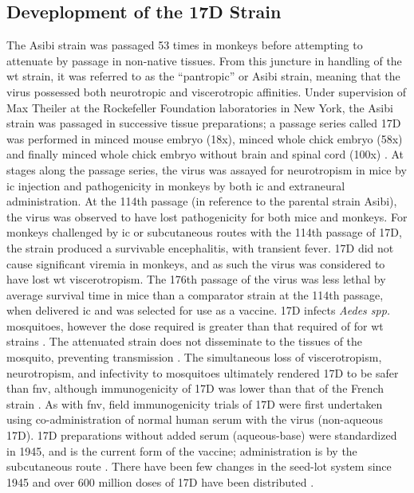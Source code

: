 \subsection{Deveplopment of the 17D Strain}
The Asibi strain was passaged 53 times in monkeys before attempting to attenuate by passage in non-native tissues. From this juncture in handling of the \gls{wt} strain, it was referred to as the “pantropic” or Asibi strain, meaning that the virus possessed both neurotropic and viscerotropic affinities. Under supervision of Max Theiler at the Rockefeller Foundation laboratories in New York, the Asibi strain was passaged in successive tissue preparations; a passage series called 17D was performed in minced mouse embryo (18x), minced whole chick embryo (58x) and finally minced whole chick embryo without brain and spinal cord (100x) \parencite{Theiler:1937wy}. At stages along the passage series, the virus was assayed for neurotropism in mice by \gls{ic} injection and pathogenicity in monkeys by both \gls{ic} and extraneural administration. At the 114th passage (in reference to the parental strain Asibi), the virus was observed to have lost pathogenicity for both mice and monkeys. For monkeys challenged by \gls{ic} or subcutaneous routes with the 114th passage of 17D, the strain produced a survivable encephalitis, with transient fever. 17D did not cause significant viremia in monkeys, and as such the virus was considered to have lost \gls{wt} viscerotropism. The 176th passage of the virus was less lethal by average survival time in mice than a comparator strain at the 114th passage, when delivered \gls{ic} and was selected for use as a vaccine. 17D infects \emph{Aedes spp.} mosquitoes, however the dose required is greater than that required of for \gls{wt} strains \parencite{Whitman:2015tu}. The attenuated strain does not disseminate to the tissues of the mosquito, preventing transmission \parencite{Miller:1988td}. The simultaneous loss of viscerotropism, neurotropism, and infectivity to mosquitoes ultimately rendered 17D to be safer than \gls{fnv}, although immunogenicity of 17D was lower than that of the French strain \parencite{Anonymous:1946tm, Stuart:1953uaa}. As with \gls{fnv}, field immunogenicity trials of 17D were first undertaken using co-administration of normal human serum with the virus (non-aqueous 17D). 17D preparations without added serum (aqueous-base) were standardized in 1945, and is the current form of the vaccine; administration is by the subcutaneous route \parencite{Quarantine:1945ui}. There have been few changes in the seed-lot system since 1945 and over 600 million doses of 17D have been distributed \parencite{Barrett:2009ed}.

